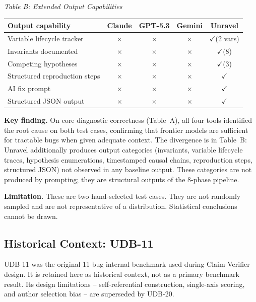 \documentclass[12pt,a4paper]{article}
\newcommand{\yes}{$\checkmark$}
\newcommand{\no}{$\times$}
\begin{document}
\vspace{4pt}
\textit{Table B: Extended Output Capabilities}
\vspace{2pt}

\begin{center}
\small\begin{tabular}{@{}p{5.2cm} cccc@{}}
\toprule
\textbf{Output capability} & \textbf{Claude} & \textbf{GPT-5.3} & \textbf{Gemini} & \textbf{Unravel} \\
\midrule
Variable lifecycle tracker     & \no & \no & \no & \yes (2 vars) \\
Invariants documented          & \no & \no & \no & \yes (8) \\
Competing hypotheses           & \no & \no & \no & \yes (3) \\
Structured reproduction steps  & \no & \no & \no & \yes \\
AI fix prompt                  & \no & \no & \no & \yes \\
Structured JSON output         & \no & \no & \no & \yes \\
\bottomrule
\end{tabular}
\end{center}

\begin{findingbox}
\textbf{Key finding.} On core diagnostic correctness (Table~A), all four tools identified
the root cause on both test cases, confirming that frontier models are sufficient for
tractable bugs when given adequate context. The divergence is in Table~B: Unravel
additionally produces output categories (invariants, variable lifecycle traces, hypothesis
enumerations, timestamped causal chains, reproduction steps, structured JSON) not observed
in any baseline output. These categories are not produced by prompting; they are structural
outputs of the 8-phase pipeline.
\end{findingbox}

\textbf{Limitation.} These are two hand-selected test cases. They are not randomly sampled
and are not representative of a distribution. Statistical conclusions cannot be drawn.

\subsection{Historical Context: UDB-11}
\label{sec:udb11-historical}

UDB-11 was the original 11-bug internal benchmark used during Claim Verifier design.
It is retained here as historical context, not as a primary benchmark result.
Its design limitations -- self-referential construction, single-axis scoring,
and author selection bias -- are superseded by UDB-20.
\end{document}
